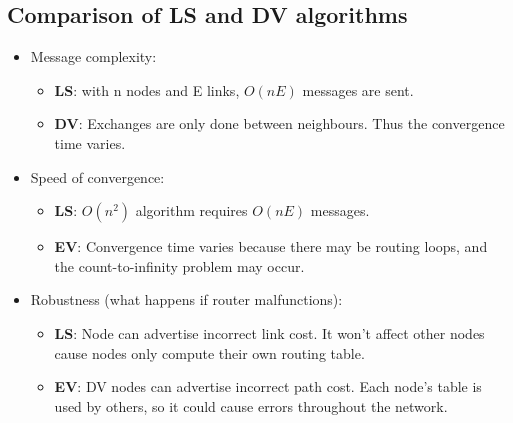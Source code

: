 \documentclass{article}
\begin{document}
\subsection{Comparison of LS and DV algorithms}

\begin{itemize}
\item Message complexity:
\begin{itemize}
\item {\bf LS}: with n nodes and E links, $O(nE)$ messages are sent.
\item {\bf DV}: Exchanges are only done between neighbours. Thus the convergence time varies.
\end{itemize}
\item Speed of convergence:
\begin{itemize}
\item {\bf LS}: $O(n^2)$ algorithm requires $O(nE)$ messages.
\item {\bf EV}: Convergence time varies because there may be routing loops, and the count-to-infinity problem may occur.
\end{itemize}
\item Robustness (what happens if router malfunctions):
\begin{itemize}
\item {\bf LS}: Node can advertise incorrect link cost. It won't affect other nodes cause nodes only compute their own routing table.
\item {\bf EV}: DV nodes can advertise incorrect path cost. Each node's table is used by others, so it could cause errors throughout the network.
\end{itemize}
\end{itemize}
\end{document}

